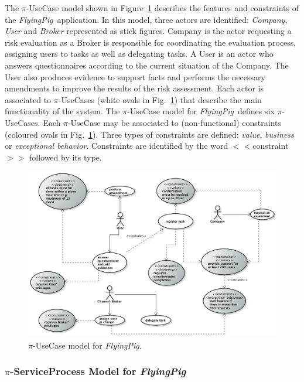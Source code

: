\documentclass{singlecol-new}
\theoremstyle{TH}{
\newtheorem{lemma}{Lemma}
\newtheorem{theorem}[lemma]{Theorem}
\newtheorem{corrolary}[lemma]{Corrolary}
\newtheorem{conjecture}[lemma]{Conjecture}
\newtheorem{proposition}[lemma]{Proposition}
\newtheorem{claim}[lemma]{Claim}
\newtheorem{stheorem}[lemma]{Wrong Theorem}
\newtheorem{algorithm}{Algorithm}
}
\theoremstyle{THrm}{
\newtheorem{definition}{Definition}[section]
\newtheorem{question}{Question}[section]
\newtheorem{remark}{Remark}
\newtheorem{scheme}{Scheme}
}
\theoremstyle{THhit}{
\newtheorem{case}{Case}[section]
}
\theoremstyle{THhsl}{
\newtheorem{example}{Example}
}
\def\FlyingPig{\textsl{FlyingPig}\xspace}
\newcommand{\martin}[1]{\marginpar{\textcolor{magenta}{\textbf{Martin: }#1}}}
\begin{document}
The $\pi$-UseCase model shown in Figure~\ref{fig:piUseCaseModel} describes the features and constraints of the \FlyingPig\ application.
In this model, three actors are identified: \textit{Company}, \textit{User} and \textit {Broker} represented as stick figures.
Company is the actor requesting a risk evaluation as a Broker is  responsible for coordinating  the evaluation process, assigning users to tasks as well as delegating tasks.
A User is an actor who answers questionnaires according to the current situation  of the Company.
The User also produces evidence to support facts and performs the necessary amendments to improve the results of the risk assessment.
Each actor is associated to $\pi$-UseCases (white ovals in Fig.~\ref{fig:piUseCaseModel})
that describe the main functionality of the system.
The $\pi$-UseCase model for \FlyingPig\ defines six $\pi$-UseCases.
Each $\pi$-UseCase may be associated to (non-functional) constraints (coloured ovals in Fig.~\ref{fig:piUseCaseModel}).\martin{colored?}
Three types of constraints are defined: \textit{value}, \textit{business} or \textit{exceptional behavior}.
Constraints are identified by the word $<<$\textsf{constraint}$>>$ followed by its type.

\begin{figure}[h]
\centering
\includegraphics[width=1\textwidth]{./figures/UseCaseGeneral.png}
\caption{$\pi$-UseCase model for \FlyingPig.\label{fig:piUseCaseModel}}
\end{figure}

\subsubsection{$\pi$-ServiceProcess Model for \FlyingPig}
\end{document}
